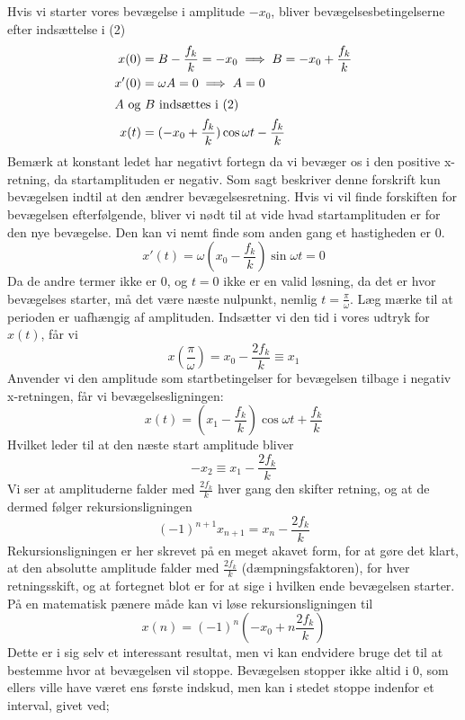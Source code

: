 Hvis vi starter vores bevægelse i amplitude $-x_0$, bliver bevægelsesbetingelserne efter indsættelse i (2)
\begin{align*}
    x(0) &= B - \frac{f_k}{k} = -x_0 \implies B = -x_0 + \frac{f_k}{k} \\
    x'(0) &= \omega A = 0 \implies A = 0 \\
    \shortintertext{$A$ og $B$ indsættes i (2)}
    x(t) &= (-x_0 + \frac{f_k}{k})\cos \omega t - \frac{f_k}{k}
\end{align*}
Bemærk at konstant ledet har negativt fortegn da vi bevæger os i den positive x-retning, da startamplituden er negativ.
Som sagt beskriver denne forskrift kun bevægelsen indtil at den ændrer bevægelsesretning. 
Hvis vi vil finde forskiften for bevægelsen efterfølgende, bliver vi nødt til at vide hvad startamplituden er for den nye bevægelse.
Den kan vi nemt finde som anden gang et hastigheden er 0.
\[
x'(t) = \omega(x_0 - \frac{f_k}{k})\sin \omega t = 0
\]
Da de andre termer ikke er 0, og $t = 0$ ikke er en valid løsning, da det er hvor bevægelses starter, må det være næste nulpunkt, nemlig $t = \frac{\pi}{\omega}$. 
Læg mærke til at perioden er uafhængig af amplituden.
Indsætter vi den tid i vores udtryk for $x(t)$, får vi 
\[
x(\frac{\pi}{\omega}) = x_0 - \frac{2f_k}{k} \equiv x_1
\]
Anvender vi den amplitude som startbetingelser for bevægelsen tilbage i negativ x-retningen, får vi bevægelsesligningen:
\[
x(t) = (x_1 - \frac{f_k}{k})\cos \omega t + \frac{f_k}{k}
\]
Hvilket leder til at den næste start amplitude bliver 
\[
-x_2 \equiv x_1 - \frac{2f_k}{k}
\]
Vi ser at amplituderne falder med $\frac{2f_k}{k}$ hver gang den skifter retning, og at de dermed følger rekursionsligningen \cite{rekursion}
\begin{equation}
    (-1)^{n+1} x_{n+1} = x_n - \frac{2f_k}{k}
\end{equation}
Rekursionsligningen er her skrevet på en meget akavet form, for at gøre det klart, at den absolutte amplitude falder med $\frac{2f_k}{k}$ (dæmpningsfaktoren), for hver retningsskift, 
og at fortegnet blot er for at sige i hvilken ende bevægelsen starter. På en matematisk pænere måde kan vi løse rekursionsligningen til
\begin{equation}
    x(n) = (-1)^n (-x_0 + n \frac{2f_k}{k})
\end{equation}
Dette er i sig selv et interessant resultat, men vi kan endvidere bruge det til at bestemme hvor at bevægelsen vil stoppe. 
Bevægelsen stopper ikke altid i 0, som ellers ville have været ens første indskud, men kan i stedet stoppe indenfor et interval, givet ved;
